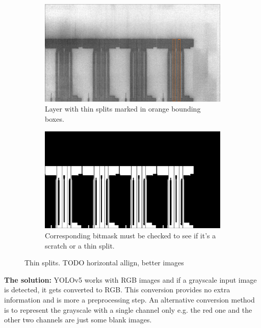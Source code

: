 \begin{figure}[ht]
  \centering

  \begin{subfigure}{0.75\textwidth}
    \includegraphics[width=\textwidth]{images/layer_01486_marked}
    \caption{Layer with thin splits marked in orange bounding boxes.}

  \end{subfigure}

  \begin{subfigure}{0.75\textwidth}
    \includegraphics[width=\textwidth]{images/bitmask_01486}
    \caption{Corresponding bitmask must be checked to see if it's a scratch or a thin split.}
  \end{subfigure}

  \caption{Thin splits. TODO horizontal allign, better images}
  \label{fig:thin_splits}

\end{figure}

\textbf{The solution:}
YOLOv5 works with RGB images and if a grayscale input image is detected, it gets converted to RGB. This conversion provides no extra information and is more a preprocessing step. An alternative conversion method is to represent the grayscale with a single channel only e.g. the red one and the other two channels are just some blank images. \\

